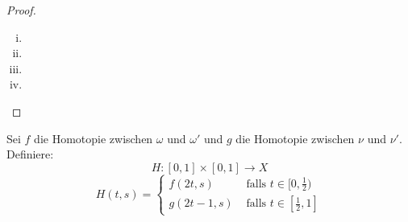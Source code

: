 \documentclass[a4paper,10pt]{scrartcl}
\begin{document}
\begin{proof}\fixme[fig51]
\begin{enumerate}[(i)]
\item \fixme[fig52]
\item \fixme[fig53]
\item \fixme[fig54]
\item \fixme[fig55]
\end{enumerate}
\end{proof}
\begin{note*}
Sei $f$ die Homotopie zwischen $\omega$ und $\omega'$ und $g$ die Homotopie zwischen $\nu$ und $ \nu'$. Definiere:
\[
 H:[0,1]\times[0,1]\to X
\]
\[
 H(t,s)=\begin{cases} f(2t, s) &\text{ falls } t\in [0, \frac{1}{2}) \\ g(2t-1,s) &\text{ falls } t\in [\frac{1}{2}, 1] \end{cases}
\]
\end{note*}
\end{document}

